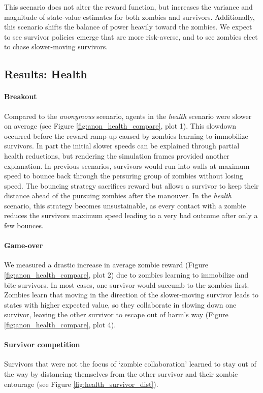 \documentclass[11pt,a4paper]{article}
\begin{document}
This scenario does not alter the reward function, but increases the variance and magnitude of state-value estimates for both zombies and survivors.
Additionally, this scenario shifts the balance of power heavily toward the zombies.
We expect to see survivor policies emerge that are more risk-averse, and to see zombies elect to chase slower-moving survivors.

\subsection{Results: Health}

\paragraph{Breakout} Compared to the \emph{anonymous} scenario, agents in the \emph{health} scenario were slower on average (see Figure \ref{fig:anon_health_compare}, plot 1).
This slowdown occurred before the reward ramp-up caused by zombies learning to immobilize survivors.
In part the initial slower speeds can be explained through partial health reductions, but rendering the simulation frames provided another explanation.
In previous scenarios, survivors would run into walls at maximum speed to bounce back through the persuring group of zombies without losing speed.
The bouncing strategy sacrifices reward but allows a survivor to keep their distance ahead of the pursuing zombies after the manouver.
In the \emph{health} scenario, this strategy becomes unsustainable, as every contact with a zombie reduces the survivors maximum speed leading to a very bad outcome after only a few bounces.

\paragraph{Game-over} We measured a drastic increase in average zombie reward (Figure \ref{fig:anon_health_compare}, plot 2) due to zombies learning to immobilize and bite survivors.
In most cases, one survivor would succumb to the zombies first.
Zombies learn that moving in the direction of the slower-moving survivor leads to states with higher expected value, so they collaborate in slowing down one survivor, leaving the other survivor to escape out of harm's way (Figure \ref{fig:anon_health_compare}, plot 4).

\paragraph{Survivor competition} Survivors that were not the focus of `zombie collaboration' learned to stay out of the way by distancing themselves from the other survivor and their zombie entourage (see Figure \ref{fig:health_survivor_dist}).
\end{document}
